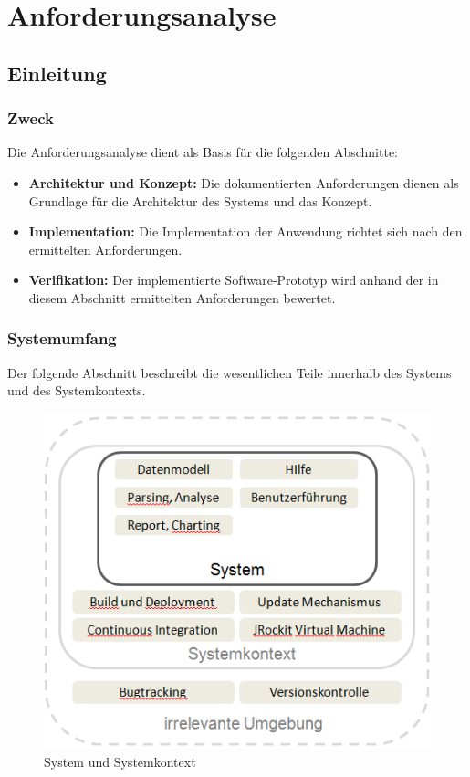 \chapter{Anforderungsanalyse}\label{anforderungsanalyse}
\section{Einleitung}
\subsection{Zweck}
Die Anforderungsanalyse dient als Basis für die folgenden Abschnitte:

\begin{itemize}
	\item \textbf{Architektur und Konzept:}  Die dokumentierten Anforderungen dienen als Grundlage für die Architektur des Systems und das Konzept. 
	\item \textbf{Implementation:} Die Implementation der Anwendung richtet sich nach den ermittelten Anforderungen. 
	\item \textbf{Verifikation:} Der implementierte Software-Prototyp wird anhand der in diesem Abschnitt ermittelten Anforderungen bewertet. 
\end{itemize}

\subsection{Systemumfang}
Der folgende Abschnitt beschreibt die wesentlichen Teile innerhalb des Systems und des Systemkontexts. 
 \begin{figure}[H]
        	\caption{System und Systemkontext}
  	\centering
    	\includegraphics{images/systemumfang}
\end{figure}
